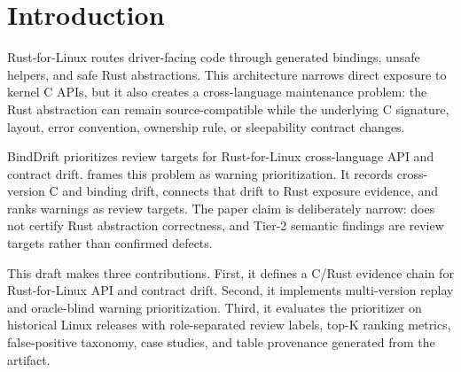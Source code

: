 \section{Introduction}

Rust-for-Linux routes driver-facing code through generated bindings, unsafe
helpers, and safe Rust abstractions. This architecture narrows direct exposure
to kernel C APIs, but it also creates a cross-language maintenance problem:
the Rust abstraction can remain source-compatible while the underlying C
signature, layout, error convention, ownership rule, or sleepability contract
changes.

BindDrift prioritizes review targets for Rust-for-Linux cross-language API and
contract drift. \tool{} frames this problem as warning prioritization. It
records cross-version C and binding drift, connects that drift to Rust exposure
evidence, and ranks warnings as review targets. The paper claim is deliberately
narrow: \tool{} does not certify Rust abstraction correctness, and Tier-2
semantic findings are review targets rather than confirmed defects.

This draft makes three contributions. First, it defines a C/Rust evidence chain
for Rust-for-Linux API and contract drift. Second, it implements multi-version
replay and oracle-blind warning prioritization. Third, it evaluates the
prioritizer on historical Linux releases with role-separated review labels,
top-K ranking metrics, false-positive taxonomy, case studies, and table
provenance generated from the artifact.

